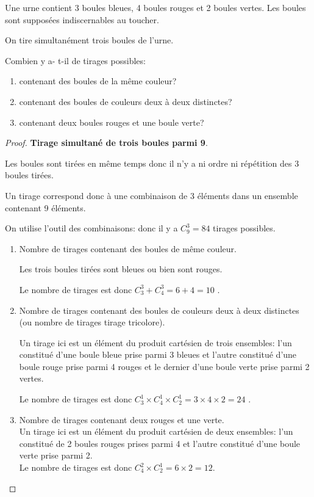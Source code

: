 \begin{example}

 Une urne contient 3 boules bleues, 4 boules rouges et 2 boules vertes. Les boules sont supposées indiscernables au toucher.
 
 On tire simultanément trois boules de l'urne.
 
Combien y a- t-il de tirages  possibles:
\begin{enumerate}
\item contenant des boules de  la même couleur?
\item contenant des boules de couleurs  deux à deux distinctes?
\item  contenant deux boules rouges et une boule verte?
\end{enumerate}
\end{example}
\begin{proof}



 \textbf{Tirage simultané de trois boules parmi 9}.

 Les boules  sont tirées en même temps  donc il n'y a ni ordre ni répétition des 3 boules tirées.

Un tirage    correspond donc à une combinaison de 3 éléments dans un ensemble contenant 9 éléments. 

On utilise l'outil des combinaisons: donc il y a $ C_{9}^{3}= 84$ tirages possibles.
\begin{enumerate}
\item Nombre de tirages contenant des boules de même couleur.

 Les trois boules tirées sont bleues ou bien  sont rouges.
 
Le nombre de tirages est donc $ C_{3}^{3}+ C_{4}^{3} = 6+4=10$ . 
\item Nombre de tirages contenant des boules de couleurs deux à deux distinctes (ou nombre de tirages  tirage tricolore).

Un tirage ici est un élément du produit cartésien de trois ensembles: l'un constitué d'une boule bleue prise parmi 3  bleues et l'autre constitué d'une boule rouge prise parmi 4  rouges et le dernier d'une boule verte prise parmi 2  vertes.

Le nombre de tirages est donc $ C_{3}^{1}\times C_{4}^{1}\times C_{2}^{1}=3\times 4\times 2=24 $ .
\item  Nombre de tirages contenant deux rouges et une verte.\\
Un tirage ici est un élément du produit cartésien de deux ensembles: l'un constitué de 2 boules rouges prises parmi 4 et l'autre constitué d'une boule verte prise parmi 2.\\
Le nombre de tirages est donc  $ C_{4}^{2}\times C_{2}^{1}=6 \times 2 =12 $. 
\end{enumerate}
\end{proof}
